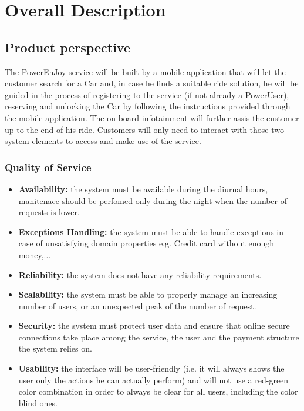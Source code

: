 \section{Overall Description}
\subsection{Product perspective}
The PowerEnJoy service will be built by a mobile application that will let the customer search for a Car and, in case he finds a suitable ride solution, he will be guided in the process of registering to the service (if not already a PowerUser), reserving and unlocking the Car by following the instructions provided through the mobile application. The on-board infotainment will further assis the customer up to the end of his ride. Customers will only need to interact with those two system elements to access and make use of the service.
\subsubsection{Quality of Service}
\begin{itemize}
    \item \textbf{Availability:} the system must be available during the diurnal hours, manitenace should be perfomed only during the night when the number of requests is lower.
    \item \textbf{Exceptions Handling:} the system must be able to handle exceptions in case of unsatisfying domain properties e.g. Credit card without enough money,...
    \item \textbf{Reliability:} the system does not have any reliability requirements.
      \item \textbf{Scalability:} the system must be able to properly manage an increasing number of users, or an unexpected peak of the number of request.
    \item \textbf{Security:} the system must protect user data and ensure that online secure connections take place among the service, the user and the payment structure the system relies on.
    \item \textbf{Usability:} the interface will be user-friendly (i.e. it will always shows the user only the actions he can actually perform) and will not use a red-green color combination in order to always be clear for all users, including the color blind ones.
\end{itemize}
